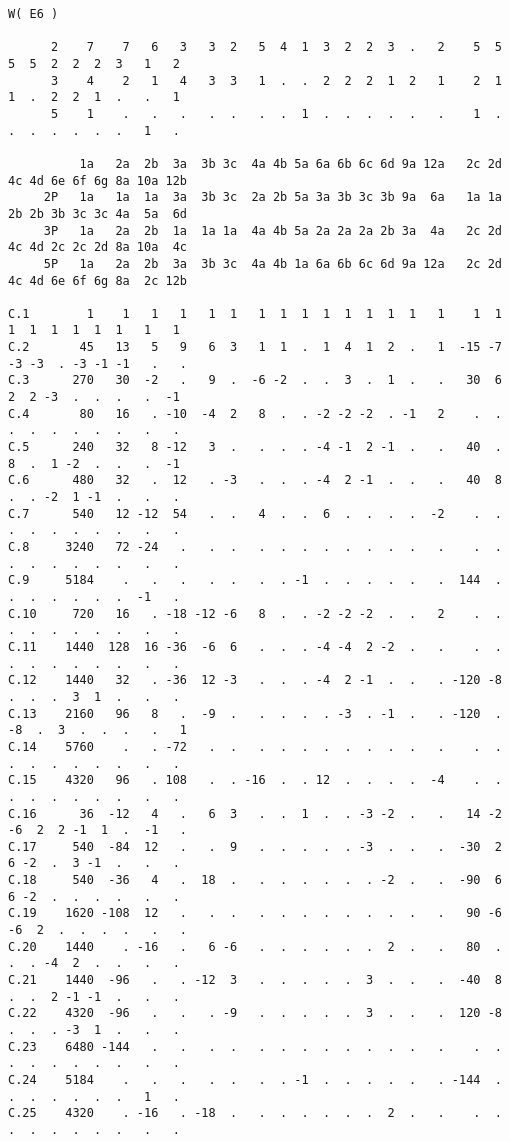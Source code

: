 \documentclass[10pt]{article}
\begin{document}
 \mbox{}
\footnotesize

\begin{verbatim}
W( E6 )

      2    7    7   6   3   3  2   5  4  1  3  2  2  3  .   2    5  5  5  5  2  2  2  3   1   2
      3    4    2   1   4   3  3   1  .  .  2  2  2  1  2   1    2  1  1  .  2  2  1  .   .   1
      5    1    .   .   .   .  .   .  .  1  .  .  .  .  .   .    1  .  .  .  .  .  .  .   1   .

          1a   2a  2b  3a  3b 3c  4a 4b 5a 6a 6b 6c 6d 9a 12a   2c 2d 4c 4d 6e 6f 6g 8a 10a 12b
     2P   1a   1a  1a  3a  3b 3c  2a 2b 5a 3a 3b 3c 3b 9a  6a   1a 1a 2b 2b 3b 3c 3c 4a  5a  6d
     3P   1a   2a  2b  1a  1a 1a  4a 4b 5a 2a 2a 2a 2b 3a  4a   2c 2d 4c 4d 2c 2c 2d 8a 10a  4c
     5P   1a   2a  2b  3a  3b 3c  4a 4b 1a 6a 6b 6c 6d 9a 12a   2c 2d 4c 4d 6e 6f 6g 8a  2c 12b

C.1        1    1   1   1   1  1   1  1  1  1  1  1  1  1   1    1  1  1  1  1  1  1  1   1   1
C.2       45   13   5   9   6  3   1  1  .  1  4  1  2  .   1  -15 -7 -3 -3  . -3 -1 -1   .   .
C.3      270   30  -2   .   9  .  -6 -2  .  .  3  .  1  .   .   30  6  2  2 -3  .  .  .   .  -1
C.4       80   16   . -10  -4  2   8  .  . -2 -2 -2  . -1   2    .  .  .  .  .  .  .  .   .   .
C.5      240   32   8 -12   3  .   .  .  . -4 -1  2 -1  .   .   40  .  8  .  1 -2  .  .   .  -1
C.6      480   32   .  12   . -3   .  .  . -4  2 -1  .  .   .   40  8  .  . -2  1 -1  .   .   .
C.7      540   12 -12  54   .  .   4  .  .  6  .  .  .  .  -2    .  .  .  .  .  .  .  .   .   .
C.8     3240   72 -24   .   .  .   .  .  .  .  .  .  .  .   .    .  .  .  .  .  .  .  .   .   .
C.9     5184    .   .   .   .  .   .  . -1  .  .  .  .  .   .  144  .  .  .  .  .  .  .  -1   .
C.10     720   16   . -18 -12 -6   8  .  . -2 -2 -2  .  .   2    .  .  .  .  .  .  .  .   .   .
C.11    1440  128  16 -36  -6  6   .  .  . -4 -4  2 -2  .   .    .  .  .  .  .  .  .  .   .   .
C.12    1440   32   . -36  12 -3   .  .  . -4  2 -1  .  .   . -120 -8  .  .  .  3  1  .   .   .
C.13    2160   96   8   .  -9  .   .  .  .  . -3  . -1  .   . -120  . -8  .  3  .  .  .   .   1
C.14    5760    .   . -72   .  .   .  .  .  .  .  .  .  .   .    .  .  .  .  .  .  .  .   .   .
C.15    4320   96   . 108   .  . -16  .  . 12  .  .  .  .  -4    .  .  .  .  .  .  .  .   .   .
C.16      36  -12   4   .   6  3   .  .  1  .  . -3 -2  .   .   14 -2 -6  2  2 -1  1  .  -1   .
C.17     540  -84  12   .   .  9   .  .  .  .  . -3  .  .   .  -30  2  6 -2  .  3 -1  .   .   .
C.18     540  -36   4   .  18  .   .  .  .  .  .  . -2  .   .  -90  6  6 -2  .  .  .  .   .   .
C.19    1620 -108  12   .   .  .   .  .  .  .  .  .  .  .   .   90 -6 -6  2  .  .  .  .   .   .
C.20    1440    . -16   .   6 -6   .  .  .  .  .  .  2  .   .   80  .  .  . -4  2  .  .   .   .
C.21    1440  -96   .   . -12  3   .  .  .  .  .  3  .  .   .  -40  8  .  .  2 -1 -1  .   .   .
C.22    4320  -96   .   .   . -9   .  .  .  .  .  3  .  .   .  120 -8  .  .  . -3  1  .   .   .
C.23    6480 -144   .   .   .  .   .  .  .  .  .  .  .  .   .    .  .  .  .  .  .  .  .   .   .
C.24    5184    .   .   .   .  .   .  . -1  .  .  .  .  .   . -144  .  .  .  .  .  .  .   1   .
C.25    4320    . -16   . -18  .   .  .  .  .  .  .  2  .   .    .  .  .  .  .  .  .  .   .   .
\end{verbatim}
\end{document}
